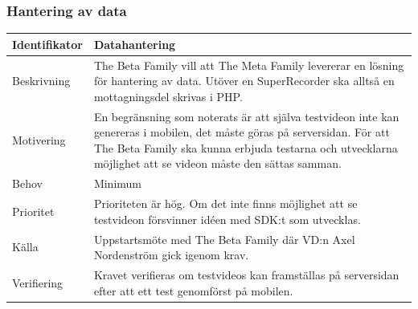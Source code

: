 \subsubsection{Hantering av data}
\begin{tabular}{ | p{65pt} | p{300pt} |}
  \hline
  Identifikator &
  Datahantering
  \\ \hline
  Beskrivning & 
  The Beta Family vill att The Meta Family levererar en lösning för hantering av data. Utöver en SuperRecorder ska alltså en mottagningsdel skrivas i PHP.
  \\ \hline
  Motivering &
  En begränsning som noterats är att själva testvideon inte kan genereras i mobilen, det måste göras på serversidan. För att The Beta Family ska kunna erbjuda testarna och utvecklarna möjlighet att se videon måste den sättas samman.
  \\ \hline
  Behov &
  Minimum
  \\ \hline
  Prioritet &
  Prioriteten är hög. Om det inte finns möjlighet att se testvideon försvinner idéen med SDK:t som utvecklas.
  \\ \hline
  Källa &
  Uppstartsmöte med The Beta Family där VD:n Axel Nordenström gick igenom krav.
  \\ \hline
  Verifiering &
  Kravet verifieras om testvideos kan framställas på serversidan efter att ett test genomförst på mobilen.
  \\ \hline
\end{tabular}

